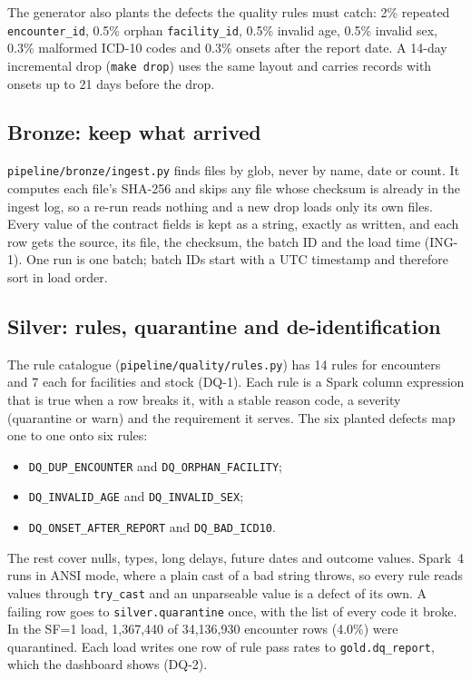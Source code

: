 The generator also plants the defects the quality rules must catch: 2\% repeated \texttt{encounter\_id},
0.5\% orphan \texttt{facility\_id}, 0.5\% invalid age, 0.5\% invalid sex, 0.3\% malformed ICD-10 codes and
0.3\% onsets after the report date. A 14-day incremental drop (\texttt{make drop}) uses the same layout and
carries records with onsets up to 21 days before the drop.

\subsection{Bronze: keep what arrived}
\texttt{pipeline/bronze/ingest.py} finds files by glob, never by name, date or count. It computes each file's
SHA-256 and skips any file whose checksum is already in the ingest log, so a re-run reads nothing and a new
drop loads only its own files. Every value of the contract fields is kept as a string, exactly as written, and
each row gets the source, its file, the checksum, the batch ID and the load time (ING-1). One run is one batch;
batch IDs start with a UTC timestamp and therefore sort in load order.

\subsection{Silver: rules, quarantine and de-identification}
The rule catalogue (\texttt{pipeline/quality/rules.py}) has 14 rules for encounters and 7 each for facilities
and stock (DQ-1). Each rule is a Spark column expression that is true when a row breaks it, with a stable reason
code, a severity (quarantine or warn) and the requirement it serves. The six planted defects map one to one onto
six rules:
\begin{itemize}
\item \texttt{DQ\_DUP\_ENCOUNTER} and \texttt{DQ\_ORPHAN\_FACILITY};
\item \texttt{DQ\_INVALID\_AGE} and \texttt{DQ\_INVALID\_SEX};
\item \texttt{DQ\_ONSET\_AFTER\_REPORT} and \texttt{DQ\_BAD\_ICD10}.
\end{itemize}
The rest cover nulls, types, long delays, future dates and outcome values. Spark~4 runs in ANSI mode, where a plain cast of a bad
string throws, so every rule reads values through \texttt{try\_cast} and an unparseable value is a defect of
its own. A failing row goes to \texttt{silver.quarantine} once, with the list of every code it broke. In the
SF=1 load, 1,367,440 of 34,136,930 encounter rows (4.0\%) were quarantined. Each load writes one
row of rule pass rates to \texttt{gold.dq\_report}, which the dashboard shows (DQ-2).

